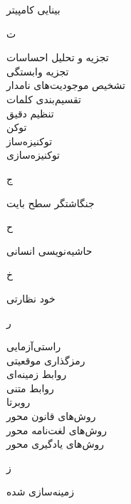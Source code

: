 بینایی کامپیتر	 \dotfill 	 {} \\ 
\begin{center}
ت
\end{center}
تجزیه و تحلیل احساسات	 \dotfill 	 {} \\ 
تجزیه وابستگی	 \dotfill 	 {} \\ 
تشخیص موجودیت‌های نامدار	 \dotfill 	 {} \\ 
تقسیم‌بندی کلمات	 \dotfill 	 {} \\ 
تنظیم دقیق	 \dotfill 	 {} \\ 
توکن	 \dotfill 	 {} \\ 
توکنیزه‌ساز	 \dotfill 	 {} \\ 
توکنیزه‌سازی	 \dotfill 	 {} \\ 
\begin{center}
ج
\end{center}
جنگاشتگر سطح بایت	 \dotfill 	 {} \\ 
\begin{center}
ح
\end{center}
حاشیه‌نویسی انسانی	 \dotfill 	 {} \\ 
\begin{center}
خ
\end{center}
خود نظارتی	 \dotfill 	 {} \\ 
\begin{center}
ر
\end{center}
راستی‌آزمایی	 \dotfill 	 {} \\ 
رمزگذاری موقعیتی	 \dotfill 	 {} \\ 
روابط زمینه‌ای	 \dotfill 	 {} \\ 
روابط متنی	 \dotfill 	 {} \\ 
روبرتا	 \dotfill 	 {} \\ 
روش‌های قانون محور	 \dotfill 	 {} \\ 
روش‌های لغت‌نامه محور	 \dotfill 	 {} \\ 
روش‌های یادگیری محور	 \dotfill 	 {} \\ 
\begin{center}
ز
\end{center}
زمینه‌سازی شده	 \dotfill 	 {} \\ 
